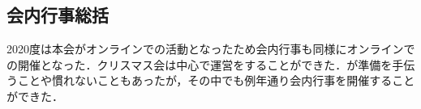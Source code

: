 \subsection*{会内行事総括}

2020度は本会がオンラインでの活動となったため会内行事も同様にオンラインでの開催となった．クリスマス会は\firstGrade{}中心で運営をすることができた．\secondGrade{}が準備を手伝うことや慣れないこともあったが，その中でも例年通り会内行事を開催することができた．
